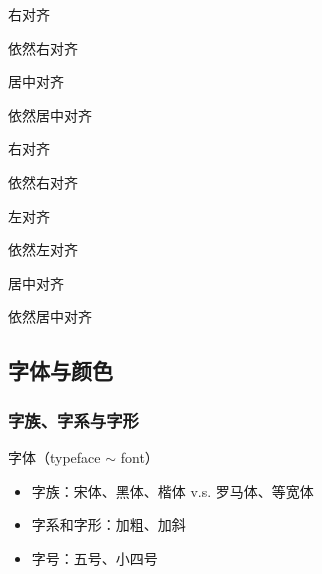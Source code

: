             \begin{flushright}
                右对齐

                依然右对齐
            \end{flushright}

            \begin{center}
                居中对齐

                依然居中对齐
            \end{center}
        
            {\raggedleft 右对齐
            
            依然右对齐

            }

            {\raggedright 左对齐\par
            依然左对齐\par
            }

            {\centering 居中对齐
            \par 依然居中对齐
            
            }


    \subsection{字体与颜色}
        \subsubsection{字族、字系与字形}
            字体（typeface $\sim$ font）
            \begin{itemize}
                \item 字族：宋体、黑体、楷体 v.s. 罗马体、等宽体
                \item 字系和字形：加粗、加斜
                \item 字号：五号、小四号
            \end{itemize}

